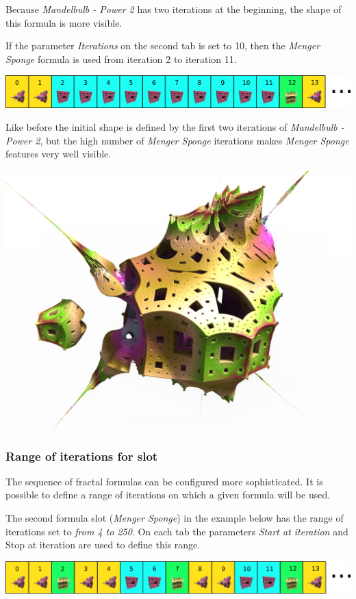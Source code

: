Because \emph{Mandelbulb - Power 2} has two iterations at the beginning, the shape of this formula is more visible.

If the parameter \emph{Iterations} on the second tab is set to 10,
then the \emph{Menger Sponge} formula is used from iteration 2 to iteration 11.

\includegraphics[width=\linewidth]{img/manual/media/iteration_loop_hybrid_sequence_3.png}

Like before the initial shape is defined by the first two iterations of \emph{Mandelbulb - Power 2},
but the high number of \emph{Menger Sponge} iterations makes \emph{Menger Sponge} features very well visible.

\includegraphics[width=0.7\linewidth]{img/manual/media/hybrid_sequence_example_3.png}

\subsubsection{Range of iterations for slot}

The sequence of fractal formulas can be configured more sophisticated.
It is possible to define a range of iterations on which a given formula will be used.

The second formula slot (\emph{Menger Sponge}) in the example below has the range of iterations set to \emph{from 4 to 250}.
On each tab the parameters \emph{Start at iteration} and {Stop at iteration} are used to define this range.

\includegraphics[width=\linewidth]{img/manual/media/iteration_loop_hybrid_sequence_4.png}

